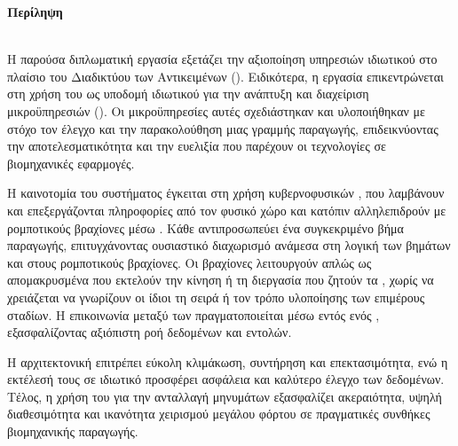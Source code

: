 \begin{center}
  {\LARGE \textbf{Περίληψη}}\\[1cm]
  \textbf{\doctitle}\\[1cm]
\end{center}

Η παρούσα διπλωματική εργασία εξετάζει την αξιοποίηση υπηρεσιών ιδιωτικού  στο πλαίσιο του Διαδικτύου των Αντικειμένων (). Ειδικότερα, η εργασία επικεντρώνεται στη χρήση του  ως υποδομή ιδιωτικού  για την ανάπτυξη και διαχείριση μικροϋπηρεσιών (). Οι μικροϋπηρεσίες αυτές σχεδιάστηκαν και υλοποιήθηκαν με στόχο τον έλεγχο και την παρακολούθηση μιας γραμμής παραγωγής, επιδεικνύοντας την αποτελεσματικότητα και την ευελιξία που παρέχουν οι τεχνολογίες  σε βιομηχανικές εφαρμογές.

Η καινοτομία του συστήματος έγκειται στη χρήση κυβερνοφυσικών , που λαμβάνουν και επεξεργάζονται πληροφορίες από τον φυσικό χώρο και κατόπιν αλληλεπιδρούν με ρομποτικούς βραχίονες μέσω . Κάθε  αντιπροσωπεύει ένα συγκεκριμένο βήμα παραγωγής, επιτυγχάνοντας ουσιαστικό διαχωρισμό  ανάμεσα στη λογική των βημάτων και στους ρομποτικούς βραχίονες. Οι βραχίονες λειτουργούν απλώς ως απομακρυσμένα  που εκτελούν την κίνηση ή τη διεργασία που ζητούν τα , χωρίς να χρειάζεται να γνωρίζουν οι ίδιοι τη σειρά ή τον τρόπο υλοποίησης των επιμέρους σταδίων. Η επικοινωνία μεταξύ των  πραγματοποιείται μέσω  εντός ενός , εξασφαλίζοντας αξιόπιστη ροή δεδομένων και εντολών.

Η αρχιτεκτονική  επιτρέπει εύκολη κλιμάκωση, συντήρηση και επεκτασιμότητα, ενώ η εκτέλεσή τους σε ιδιωτικό  προσφέρει ασφάλεια και καλύτερο έλεγχο των δεδομένων. Τέλος, η χρήση του  για την ανταλλαγή μηνυμάτων εξασφαλίζει ακεραιότητα, υψηλή διαθεσιμότητα και ικανότητα χειρισμού μεγάλου φόρτου σε πραγματικές συνθήκες βιομηχανικής παραγωγής.

\clearpage

\begin{center}
  {\LARGE \textbf{}}\\[1cm]
  \textbf{\en{\engdoctitle}}\\[1cm]
\end{center}
